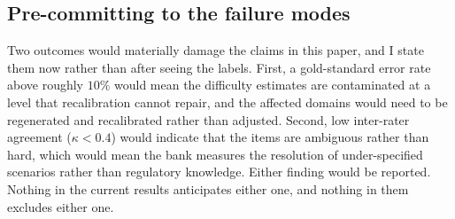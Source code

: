 \subsection{Pre-committing to the failure modes}
Two outcomes would materially damage the claims in this paper, and I
state them now rather than after seeing the labels. First, a
gold-standard error rate above roughly $10\%$ would mean the difficulty
estimates are contaminated at a level that recalibration cannot repair,
and the affected domains would need to be regenerated and recalibrated
rather than adjusted. Second, low inter-rater agreement ($\kappa < 0.4$)
would indicate that the items are ambiguous rather than hard, which would
mean the bank measures the resolution of under-specified scenarios rather
than regulatory knowledge. Either finding would be reported. Nothing in
the current results anticipates either one, and nothing in them excludes
either one.
